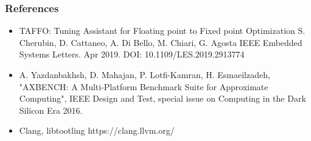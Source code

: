 \documentclass{beamer}
\begin{document}
\begin{frame}[fragile]
	\frametitle{References}
	\begin{block}{}
		\begin{itemize}
			\item  TAFFO: Tuning Assistant for Floating point to Fixed point Optimization S. Cherubin, D. Cattaneo, A. Di Bello, M. Chiari, G. Agosta 
IEEE Embedded Systems Letters. Apr 2019. 
DOI: 10.1109/LES.2019.2913774
			\item A. Yazdanbakhsh, D. Mahajan, P. Lotfi-Kamran, H. Esmaeilzadeh, "AXBENCH: A Multi-Platform Benchmark Suite for Approximate Computing", IEEE Design and Test, special issue on Computing in the Dark Silicon Era 2016.
			\item Clang, libtootling https://clang.llvm.org/
		\end{itemize}
	\end{block}
\end{frame}
\end{document}

